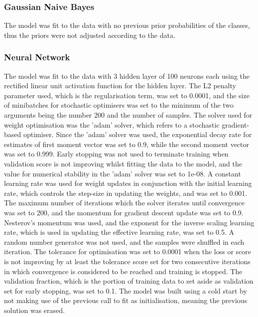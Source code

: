 \subsubsection{Gaussian Naive Bayes}
The model was fit to the data with no previous prior probabilities of the classes, thus the priors were not adjusted according to the data.

\subsubsection{Neural Network}
The model was fit to the data with 3 hidden layer of 100 neurons each using the rectified linear unit activation function for the hidden layer. The L2 penalty parameter used, which is the regularisation term, was set to 0.0001, and the size of minibatches for stochastic optimisers was set to the minimum of the two arguments being the number 200 and the number of samples. The solver used for weight optimisation was the 'adam' solver, which refers to a stochastic gradient-based optimiser. Since the 'adam' solver was used, the exponential decay rate for estimates of first moment vector was set to 0.9, while the second moment vector was set to 0.999. Early stopping was not used to terminate training when validation score is not improving whilst fitting the data to the model, and the value for numerical stability in the 'adam' solver was set to 1e-08. A constant learning rate was used for weight updates in conjunction with the initial learning rate, which controls the step-size in updating the weights, and was set to 0.001. The maximum number of iterations which the solver iterates until convergence was set to 200, and the momentum for gradient descent update was set to 0.9. Nesterov's momentum was used, and the exponent for the inverse scaling learning rate, which is used in updating the effective learning rate, was set to 0.5. A random number generator was not used, and the samples were shuffled in each iteration. The tolerance for optimisation was set to 0.0001 when the loss or score is not improving by at least the tolerance score set for two consecutive iterations in which convergence is considered to be reached and training is stopped. The validation fraction, which is the portion of training data to set aside as validation set for early stopping, was set to 0.1. The model was built using a cold start by not making use of the previous call to fit as initialisation, meaning the previous solution was erased.

